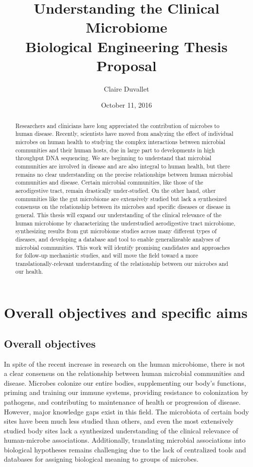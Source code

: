 \documentclass[12pt]{article}
\title{Understanding the Clinical Microbiome \\ Biological Engineering Thesis Proposal}
\author{Claire Duvallet}
\date{October 11, 2016}
\begin{document}
\maketitle
\newpage
\tableofcontents
\newpage
\begin{abstract}
Researchers and clinicians have long appreciated the contribution of microbes
to human disease. Recently, scientists have moved from analyzing the effect of
individual microbes on human health to studying the complex interactions between
microbial communities and their human hosts, due in large part to developments
in high throughput DNA sequencing. We are beginning to understand
that microbial communities are involved in disease and are also
integral to human health,
but there remains no clear understanding on the precise relationships between human 
microbial communities and disease. Certain microbial communities, like those
of the aerodigestive tract, remain drastically under-studied. On the other hand,
other communities like the gut microbiome are extensively studied but lack
a synthesized consensus on the relationship between its microbes 
and specific diseases or disease in general.
This thesis will expand our understanding of the clinical relevance
of the human microbiome by characterizing the 
understudied aerodigestive tract microbiome,
synthesizing results from gut microbiome studies across
many different types of diseases, and developing a database and tool to enable generalizeable analyses
of microbial communities. This work will identify promising candidates and approaches
for follow-up mechanistic studies, and will move the field toward a more
translationally-relevant understanding of the relationship between our microbes
and our health.


\end{abstract}
\newpage

\section{Overall objectives and specific aims}
\subsection{Overall objectives}
In spite of the recent increase in research on the human 
microbiome, there is not a clear consensus on the relationship between 
human microbial communities and disease. Microbes colonize our entire bodies,
supplementing our body's functions, priming and training our immune 
systems, providing resistance to colonization 
by pathogens, and contributing to maintenance of health or progression of disease. 
However, major knowledge gaps exist in this field. 
The microbiota of certain body sites have been much less studied than others, and 
even the most extensively studied body sites lack a 
synthesized understanding of the clinical relevance of human-microbe associations. 
Additionally, translating microbial associations into biological hypotheses
remains challenging due to the lack of centralized tools and databases
for assigning biological meaning to groups of microbes.
\end{document}

